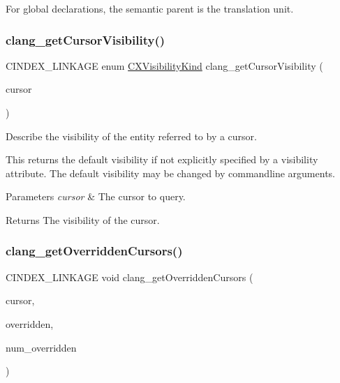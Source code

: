 For global declarations, the semantic parent is the translation unit. \mbox{\label{group__CINDEX__CURSOR__MANIP_ga935b442bd6bde168cf354b7629b471d8}} 
\subsubsection{\texorpdfstring{clang\+\_\+get\+Cursor\+Visibility()}{clang\_getCursorVisibility()}}
{\footnotesize\ttfamily C\+I\+N\+D\+E\+X\+\_\+\+L\+I\+N\+K\+A\+GE enum \mbox{\hyperlink{group__CINDEX__CURSOR__MANIP_gaf92fafb489ab66529aceab51818994cb}{C\+X\+Visibility\+Kind}} clang\+\_\+get\+Cursor\+Visibility (\begin{DoxyParamCaption}\item[{\mbox{\hyperlink{structCXCursor}{C\+X\+Cursor}}}]{cursor }\end{DoxyParamCaption})}



Describe the visibility of the entity referred to by a cursor. 

This returns the default visibility if not explicitly specified by a visibility attribute. The default visibility may be changed by commandline arguments.


\begin{DoxyParams}{Parameters}
{\em cursor} & The cursor to query.\\
\hline
\end{DoxyParams}
\begin{DoxyReturn}{Returns}
The visibility of the cursor. 
\end{DoxyReturn}
\mbox{\label{group__CINDEX__CURSOR__MANIP_gac308b03420c550e00c61153dc63deac8}} 
\subsubsection{\texorpdfstring{clang\+\_\+get\+Overridden\+Cursors()}{clang\_getOverriddenCursors()}}
{\footnotesize\ttfamily C\+I\+N\+D\+E\+X\+\_\+\+L\+I\+N\+K\+A\+GE void clang\+\_\+get\+Overridden\+Cursors (\begin{DoxyParamCaption}\item[{\mbox{\hyperlink{structCXCursor}{C\+X\+Cursor}}}]{cursor,  }\item[{\mbox{\hyperlink{structCXCursor}{C\+X\+Cursor}} $\ast$$\ast$}]{overridden,  }\item[{unsigned $\ast$}]{num\+\_\+overridden }\end{DoxyParamCaption})}



